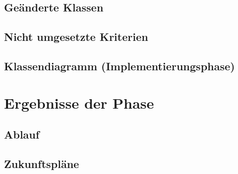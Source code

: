 \documentclass[a4paper]{scrreprt}
\begin{document}
\section{Geänderte Klassen}
\section{Nicht umgesetzte Kriterien}
\section{Klassendiagramm (Implementierungsphase)}

\chapter{Ergebnisse der Phase}
\section{Ablauf}
\section{Zukunftspläne}



\glsaddall
\printnoidxglossaries

\listoffigures
 
\end{document}
